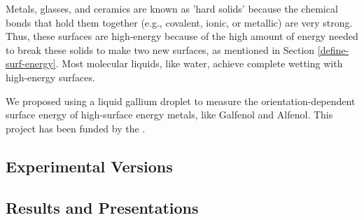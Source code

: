 Metals, glasses, and ceramics are known as 'hard solids' because the chemical bonds that hold them together (e.g., covalent, ionic, or metallic) are very strong. Thus, these surfaces are high-energy because of the high amount of energy needed to break these solids to make two new surfaces, as mentioned in Section \ref{define-surf-energy}. Most molecular liquids, like water, achieve complete wetting with high-energy surfaces.




We proposed using a liquid gallium droplet to measure the orientation-dependent surface energy of high-surface energy metals, like Galfenol and Alfenol. This project has been funded by the \NSF. 




\subsection{Experimental Versions}


\subsection{Results and Presentations}

